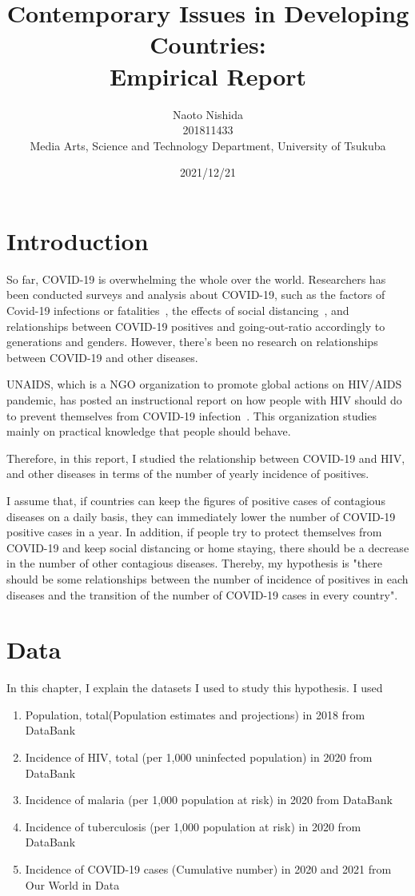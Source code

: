 \documentclass[12pt]{report}
\title{Contemporary Issues in Developing Countries: \\Empirical Report}
\author{Naoto Nishida\\201811433\\ Media Arts, Science and Technology Department, University of Tsukuba}
\date{2021/12/21}
\begin{document}
\maketitle
\tableofcontents

\chapter{Introduction}

So far, COVID-19 is overwhelming the whole over the world.
Researchers has been conducted surveys and analysis about COVID-19, such as the factors of Covid-19 infections or fatalities~\cite{toya2021cross,tsubasa2021modeling}, the effects of social distancing~\cite{CATO202051}, and relationships between COVID-19 positives and going-out-ratio accordingly to generations and genders.
However, there's been no research on relationships between COVID-19 and other diseases. 

UNAIDS, which is a NGO organization to promote global actions on HIV/AIDS pandemic, has posted an instructional report on how people with HIV should do to prevent themselves from COVID-19 infection~\cite{unaids, unaids_report}.
This organization studies mainly on practical knowledge that people should behave.

Therefore, in this report, I studied the relationship between COVID-19 and HIV, and other diseases in terms of the number of yearly incidence of positives. 


I assume that, if countries can keep the figures of positive cases of contagious diseases on a daily basis, they can immediately lower the number of COVID-19 positive cases in a year.
In addition, if people try to protect themselves from COVID-19 and keep social distancing or home staying, there should be a decrease in the number of other contagious diseases.
Thereby, my hypothesis is "there should be some relationships between the number of incidence of positives in each diseases and the transition of the number of COVID-19 cases in every country".

\chapter{Data}

In this chapter, I explain the datasets I used to study this hypothesis.
I used 
\begin{enumerate}
    \item Population, total(Population estimates and projections) in 2018 from DataBank~\cite{databank}
    \item Incidence of HIV, total (per 1,000 uninfected population) in 2020 from DataBank~\cite{databank}
    \item Incidence of malaria (per 1,000 population at risk) in 2020 from DataBank~\cite{databank}
    \item Incidence of tuberculosis (per 1,000 population at risk) in 2020 from DataBank~\cite{databank}
    \item Incidence of COVID-19 cases (Cumulative number) in 2020 and 2021 from Our World in Data~\cite{ourworldindata}
\end{enumerate}
\end{document}
